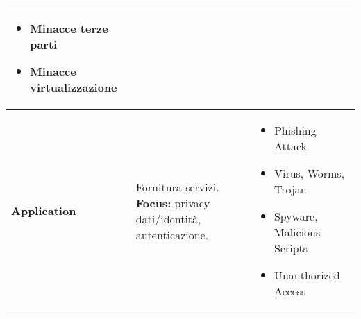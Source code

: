 \begin{table}[H]
\begin{tabular}{|p{}|p{}|p{}|}
\begin{itemize}[nosep, leftmargin=*, itemsep=-2pt, before=\vspace{-0.5\baselineskip}, after=\vspace{-\baselineskip}]
        \item Minacce terze parti
        \item Minacce virtualizzazione
    \end{itemize} \\
\hline
\textbf{Application} & Fornitura servizi. \newline \textbf{Focus:} privacy dati/identità, autenticazione. &
    \begin{itemize}[nosep, leftmargin=*, itemsep=-2pt, before=\vspace{-0.5\baselineskip}, after=\vspace{-\baselineskip}]
        \item Phishing Attack
        \item Virus, Worms, Trojan
        \item Spyware, Malicious Scripts
        \item Unauthorized Access
    \end{itemize} \\
\hline
\end{tabular}
\end{table}

